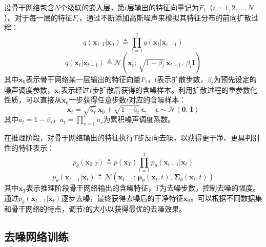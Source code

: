 设骨干网络包含$N$个级联的嵌入层，第$i$层输出的特征向量记为$F_i$（$i = 1, 2, \ldots, N$）。对于每一层的特征$F_i$，通过不断添加高斯噪声来模拟其特征分布的前向扩散过程：
\begin{equation}
q(\mathbf{x}_{1:T} | \mathbf{x}_0) \triangleq \prod_{t=1}^T q(\mathbf{x}_t | \mathbf{x}_{t-1})
\label{eq:chap3_forward_joint}
\end{equation}
\vspace{-2pt}
\begin{equation}
q(\mathbf{x}_t|\mathbf{x}_{t-1}) \triangleq \mathcal{N}\!\left(\mathbf{x}_t;\, \sqrt{1-\beta_t}\,\mathbf{x}_{t-1},\, \beta_t \mathbf{I}\right)
\label{eq:chap3_forward_step}
\end{equation}
其中$\mathbf{x}_0$表示骨干网络某一层输出的特征向量$F_i$，$t$表示扩散步数，$\beta_t$为预先设定的噪声调度参数，$\mathbf{x}_t$表示经过$t$步扩散后获得的含噪样本。利用扩散过程的重参数化性质，可以直接从$\mathbf{x}_0$一步获得任意步数$t$对应的含噪样本：
\begin{equation}
\mathbf{x}_t = \sqrt{\bar{a}_t}\,\mathbf{x}_0 + \sqrt{1-\bar{a}_t}\,\boldsymbol{\epsilon}, \quad \boldsymbol{\epsilon} \sim \mathcal{N}(\mathbf{0},\, \mathbf{I})
\label{eq:chap3_reparam}
\end{equation}
其中$a_t = 1 - \beta_t$，$\bar{a}_t = \prod_{s=1}^{t} a_s$为累积噪声调度系数。

在推理阶段，对骨干网络输出的特征执行$T$步反向去噪，以获得更干净、更具判别性的特征表示：
\begin{equation}
p_\theta(\mathbf{x}_{0:T}) \triangleq p(\mathbf{x}_T)\prod_{t=1}^T p_\theta(\mathbf{x}_{t-1}|\mathbf{x}_t)
\label{eq:chap3_reverse_joint}
\end{equation}
\vspace{-2pt}
\begin{equation}
p_\theta(\mathbf{x}_{t-1}|\mathbf{x}_t) \triangleq \mathcal{N}\!\left(\mathbf{x}_{t-1};\, \boldsymbol{\mu}_\theta(\mathbf{x}_t, t),\, \boldsymbol{\Sigma}_\theta(\mathbf{x}_t, t)\right)
\label{eq:chap3_reverse_step}
\end{equation}
其中$\mathbf{x}_T$表示推理阶段骨干网络输出的含噪特征，$T$为去噪步数，控制去噪的幅度。通过$p_\theta(\mathbf{x}_{t-1}|\mathbf{x}_t)$逐步去噪，最终获得去噪后的干净特征$\mathbf{x}_0$。可以根据不同数据集和骨干网络的特点，调节$t$的大小以获得最优的去噪效果。

\subsection{去噪网络训练}

